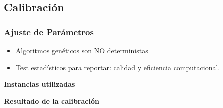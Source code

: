 \subsection{Calibración}
\begin{frame}\frametitle{Ajuste de Parámetros}
\begin{itemize}
\item Algoritmos genéticos son NO deterministas
\item Test estadísticos para reportar: calidad y eficiencia computacional.
\end{itemize}

\begin{small}
\textbf{Instancias utilizadas}
\end{small}
\begin{table}[h!]
\centering
\end{table}


\begin{small}
\textbf{Resultado de la calibración}
\end{small}

\begin{table}[h!]
\centering
\label{tab:resultAjuste}
\end{table}
\end{frame}

